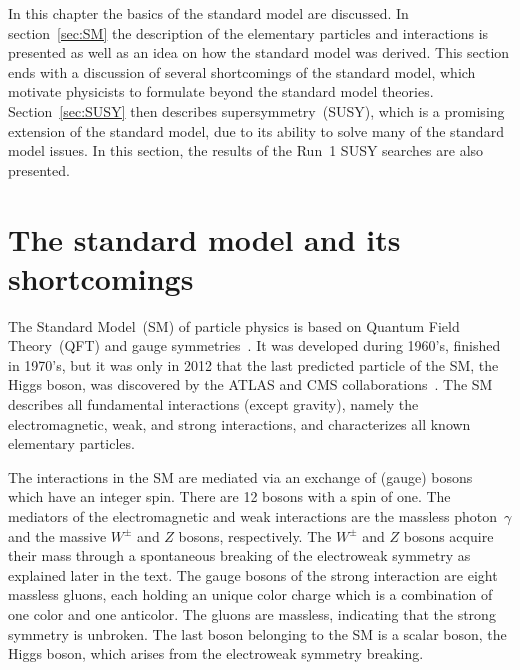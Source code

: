 \clearpage

\setcounter{secnumdepth}{4}
\setcounter{secnumdepth}{4}

In this chapter the basics of the standard model are discussed. In section~\ref{sec:SM} the description of the elementary particles and interactions is presented as well as an idea on how the standard model was derived. This section ends with a discussion of several shortcomings of the standard model, which motivate physicists to formulate beyond the standard model theories. Section~\ref{sec:SUSY} then describes supersymmetry~(SUSY), which is a promising extension of the standard model, due to its ability to solve many of the standard model issues. In this section, the results of the Run~1 SUSY searches are also presented. 

\section{The standard model and its shortcomings~\label{sec:SM}}

The Standard Model~(SM) of particle physics is based on Quantum Field Theory~(QFT) and gauge symmetries~\cite{9783527406012}. It was developed during 1960's, finished in 1970's, but it was only in 2012 that the last predicted particle of the SM, the Higgs boson, was discovered by the ATLAS and CMS collaborations~\cite{Chatrchyan:2012xdj, Aad:2012tfa}. The SM describes all fundamental interactions (except gravity), namely the electromagnetic, weak, and strong interactions, and characterizes all known elementary particles. 


The interactions in the SM are mediated via an exchange of (gauge) bosons which have an integer spin. There are 12 bosons with a spin of one. The mediators of the electromagnetic and weak interactions are the massless photon~$\gamma$ and the massive $W^{\pm}$ and $Z$ bosons, respectively. The $W^{\pm}$ and $Z$ bosons acquire their mass through a spontaneous breaking of the electroweak symmetry as explained later in the text. The gauge bosons of the strong interaction are eight massless gluons, each holding an unique color charge which is a combination of one color and one anticolor. The gluons are massless, indicating that the strong symmetry is unbroken. The last boson belonging to the SM is a scalar boson, the Higgs boson, which arises from the electroweak symmetry breaking. 

